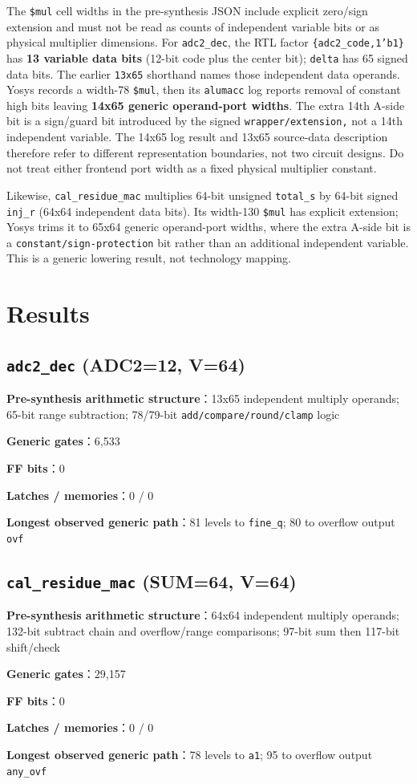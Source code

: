 \documentclass[UTF8,fontset=fandol,10pt,a4paper,openany]{ctexrep}
\newcommand{\code}[1]{\nolinkurl{#1}}
\begin{document}
The \code{$mul} cell widths in the pre-synthesis JSON include explicit zero/sign extension and must not be read as counts of independent variable bits or as physical multiplier dimensions. For \code{adc2_dec}, the RTL factor \texttt{\{adc2\_code,1'b1\}} has \textbf{13 variable data bits} (12-bit code plus the center bit); \code{delta} has 65 signed data bits. The earlier \code{13x65} shorthand names those independent data operands. Yosys records a width-78 \code{$mul}, then its \code{alumacc} log reports removal of constant high bits leaving \textbf{14x65 generic operand-port widths}. The extra 14th A-side bit is a sign/guard bit introduced by the signed \code{wrapper/extension,} not a 14th independent variable. The 14x65 log result and 13x65 source-data description therefore refer to different representation boundaries, not two circuit designs. Do not treat either frontend port width as a fixed physical multiplier constant.


Likewise, \code{cal_residue_mac} multiplies 64-bit unsigned \code{total_s} by 64-bit signed \code{inj_r} (64x64 independent data bits). Its width-130 \code{$mul} has explicit extension; Yosys trims it to 65x64 generic operand-port widths, where the extra A-side bit is a \code{constant/sign-protection} bit rather than an additional independent variable. This is a generic lowering result, not technology mapping.


\section{Results}


\subsection*{\code{adc2_dec} (ADC2=12, V=64)}
\noindent\textbf{Pre-synthesis arithmetic structure}：13x65 independent multiply operands; 65-bit range subtraction; 78/79-bit \code{add/compare/round/clamp} logic\par
\noindent\textbf{Generic gates}：6,533\par
\noindent\textbf{FF bits}：0\par
\noindent\textbf{Latches / memories}：0 / 0\par
\noindent\textbf{Longest observed generic path}：81 levels to \code{fine_q}; 80 to overflow output \code{ovf}\par
\subsection*{\code{cal_residue_mac} (SUM=64, V=64)}
\noindent\textbf{Pre-synthesis arithmetic structure}：64x64 independent multiply operands; 132-bit subtract chain and overflow/range comparisons; 97-bit sum then 117-bit shift/check\par
\noindent\textbf{Generic gates}：29,157\par
\noindent\textbf{FF bits}：0\par
\noindent\textbf{Latches / memories}：0 / 0\par
\noindent\textbf{Longest observed generic path}：78 levels to \code{a1}; 95 to overflow output \code{any_ovf}\par
\end{document}
